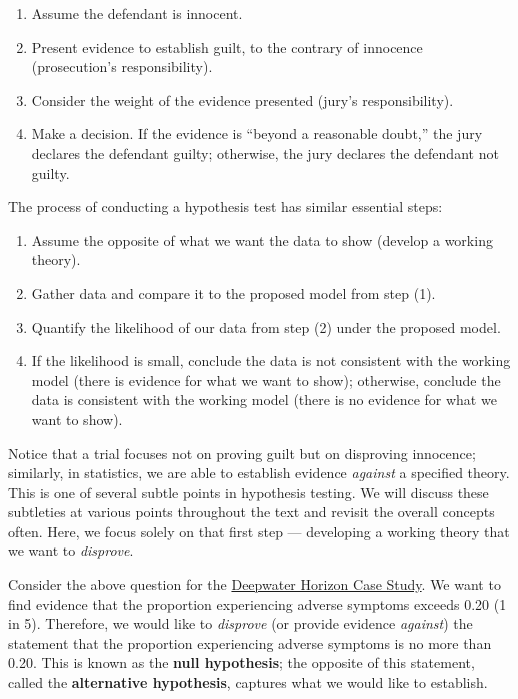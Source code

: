 \documentclass[]{book}
\providecommand{\tightlist}{%
  \setlength{\itemsep}{0pt}\setlength{\parskip}{0pt}}
\theoremstyle{plain}
\theoremstyle{mydefn}
\theoremstyle{myexmpl}
\theoremstyle{remark}
\begin{document}
\begin{enumerate}
\def\labelenumi{\arabic{enumi}.}
\tightlist
\item
  Assume the defendant is innocent.
\item
  Present evidence to establish guilt, to the contrary of innocence
  (prosecution's responsibility).
\item
  Consider the weight of the evidence presented (jury's responsibility).
\item
  Make a decision. If the evidence is ``beyond a reasonable doubt,'' the
  jury declares the defendant guilty; otherwise, the jury declares the
  defendant not guilty.
\end{enumerate}

The process of conducting a hypothesis test has similar essential steps:

\begin{enumerate}
\def\labelenumi{\arabic{enumi}.}
\tightlist
\item
  Assume the opposite of what we want the data to show (develop a
  working theory).
\item
  Gather data and compare it to the proposed model from step (1).
\item
  Quantify the likelihood of our data from step (2) under the proposed
  model.
\item
  If the likelihood is small, conclude the data is not consistent with
  the working model (there is evidence for what we want to show);
  otherwise, conclude the data is consistent with the working model
  (there is no evidence for what we want to show).
\end{enumerate}

Notice that a trial focuses not on proving guilt but on disproving
innocence; similarly, in statistics, we are able to establish evidence
\emph{against} a specified theory. This is one of several subtle points
in hypothesis testing. We will discuss these subtleties at various
points throughout the text and revisit the overall concepts often. Here,
we focus solely on that first step --- developing a working theory that
we want to \emph{disprove}.

Consider the above question for the
\protect\hyperlink{CaseDeepwater}{Deepwater Horizon Case Study}. We want
to find evidence that the proportion experiencing adverse symptoms
exceeds 0.20 (1 in 5). Therefore, we would like to \emph{disprove} (or
provide evidence \emph{against}) the statement that the proportion
experiencing adverse symptoms is no more than 0.20. This is known as the
\textbf{null hypothesis}; the opposite of this statement, called the
\textbf{alternative hypothesis}, captures what we would like to
establish.
\end{document}
